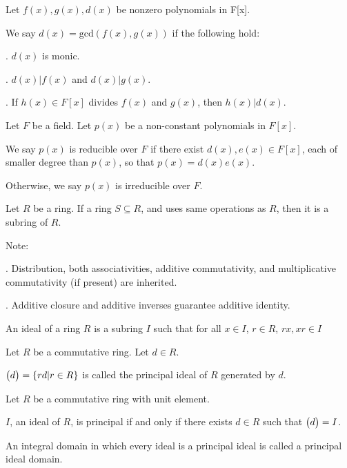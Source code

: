 \documentclass{article}
\begin{document}
Let $f(x),g(x),d(x)$ be nonzero polynomials in F[x].

We say $d(x)=\text{gcd}(f(x),g(x))$ if the following hold:

\indent{}. $d(x)$ is monic.

\indent{}. $d(x)|f(x)$ and $d(x)|g(x)$.

\indent{}. If $h(x)\in F[x]$ divides $f(x)$ and $g(x)$, then $h(x)|d(x)$.


Let $F$ be a field.
Let $p(x)$ be a non-constant polynomials in $F[x]$.

We say $p(x)$ is reducible over $F$ if there exist $d(x),e(x)\in F[x]$, each of smaller degree than $p(x)$, so that $p(x)=d(x)e(x)$.

Otherwise, we say $p(x)$ is irreducible over $F$.


Let $R$ be a ring. If a ring $S \subseteq R$, and uses same operations as $R$, then it is a subring of $R$.

Note:

\indent{}. Distribution, both associativities, additive commutativity, and multiplicative commutativity (if present) are inherited.

\indent{}. Additive closure and additive inverses guarantee additive identity.


An ideal of a ring $R$ is a subring $I$ such that for all $x\in I$, $r\in R$, $rx, xr\in I$


Let $R$ be a commutative ring.
Let $d\in R$.

$\big{(}d\big{)}=\{rd|r\in R\}$ is called the principal ideal of $R$ generated by $d$.


Let $R$ be a commutative ring with unit element.

$I$, an ideal of $R$, is principal if and only if there exists $d\in R$ such that $\big{(}d\big{)}=I$.


An integral domain in which every ideal is a principal ideal is called a principal ideal domain.

\newpage

\end{document}

